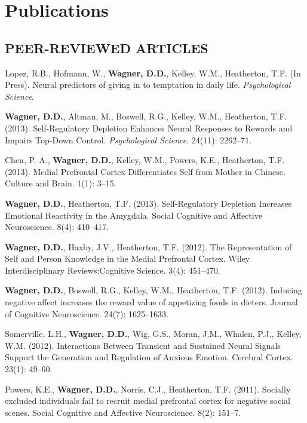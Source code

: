 \documentclass[11pt,letter,roman]{moderncv}
\begin{document}
\section{Publications}
\subsection{PEER-REVIEWED ARTICLES}
\begin{bibenum}
\item Lopez, R.B., Hofmann, W., \textbf{Wagner, D.D.}, Kelley, W.M., Heatherton, T.F. (In Press). Neural predictors of giving in to temptation in daily life. \emph{Psychological Science}.

\item \textbf{Wagner, D.D.}, Altman, M., Boswell, R.G., Kelley, W.M., Heatherton, T.F. (2013). Self-Regulatory Depletion Enhances Neural Responses to Rewards and Impairs Top-Down Control. \emph{Psychological Science}. 24(11): 2262--71.

\item Chen, P. A., \textbf{Wagner, D.D.}, Kelley, W.M., Powers, K.E., Heatherton, T.F. (2013). Medial Prefrontal Cortex Differentiates Self from Mother in Chinese. Culture and Brain. 1(1): 3--15.

\item \textbf{Wagner, D.D.}, Heatherton, T.F. (2013). Self-Regulatory Depletion Increases Emotional Reactivity in the Amygdala.  Social Cognitive and Affective Neuroscience. 8(4): 410--417.

\item \textbf{Wagner, D.D.}, Haxby, J.V., Heatherton, T.F. (2012). The Representation of Self and Person Knowledge in the Medial Prefrontal Cortex. Wiley Interdisciplinary Reviews:Cognitive Science. 3(4): 451--470.

\item \textbf{Wagner, D.D.}, Boswell, R.G., Kelley, W.M., Heatherton, T.F. (2012). Inducing negative affect increases the reward value of appetizing foods in dieters. Journal of Cognitive Neuroscience. 24(7): 1625--1633.

\item Somerville, L.H., \textbf{Wagner, D.D.}, Wig, G.S., Moran, J.M., Whalen, P.J., Kelley, W.M. (2012). Interactions Between Transient and Sustained Neural Signals Support the Generation and Regulation of Anxious Emotion. Cerebral Cortex. 23(1): 49--60.

\item Powers, K.E., \textbf{Wagner, D.D.}, Norris, C.J., Heatherton, T.F. (2011). Socially excluded individuals fail to recruit medial prefrontal cortex for negative social scenes. Social Cognitive and Affective Neuroscience. 8(2): 151--7.


\end{bibenum}
\end{document}
